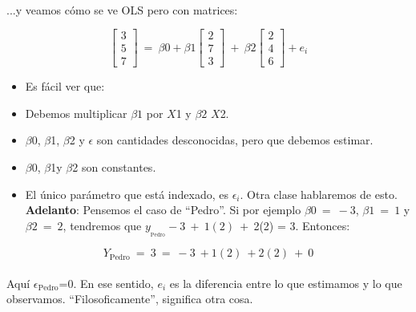 \documentclass[10pt]{article}
\begin{document}
\paragraph{}...y veamos c\'omo se ve OLS pero con matrices:


\begin{equation*}
\begin{bmatrix}
3\\
5\\
7
\end{bmatrix} \ =\ \beta 0+\beta 1\begin{bmatrix}
2\\
7\\
3
\end{bmatrix} \ +\ \beta 2\begin{bmatrix}
2\\
4\\
6
\end{bmatrix} +e_{i}
\end{equation*}


\begin{itemize}
\item Es f\'acil ver que:
\item Debemos multiplicar $\displaystyle \beta 1$ por $\displaystyle X$1 y $\displaystyle \beta 2$ $\displaystyle X$2.
\item $\displaystyle \beta $0, $\displaystyle \beta $1, $\displaystyle \beta $2 y $\displaystyle \epsilon $ son cantidades desconocidas, pero que debemos estimar.
\item $\displaystyle \beta $0, $\displaystyle \beta $1y $\displaystyle \beta $2 son constantes.
\item El \'unico par\'ametro que est\'a indexado, es $\displaystyle \epsilon _{i}$. Otra clase hablaremos de esto. \textbf{Adelanto}: Pensemos el caso de ``Pedro''. Si por ejemplo $\displaystyle \beta 0\ =\ -3$, $\displaystyle \beta 1\ =\ 1$ y $\displaystyle \beta 2\ =\ 2$, tendremos que $\displaystyle y_{_{\text{Pedro}}} -3\ +\ 1( 2) \ +\ $2(2) = 3. Entonces:
\end{itemize}


\begin{equation*}
Y_{\text{Pedro}} \ =\ 3\ =\ -3\ +1( 2) \ +2( 2) \ +\ 0
\end{equation*}


\paragraph{}Aqu\'i $\displaystyle \epsilon _{\text{Pedro}}$=0. En ese sentido, $\displaystyle e_{i}$ es la diferencia entre lo que estimamos y lo que observamos. ``Filosoficamente'', significa otra cosa.
\end{document}
